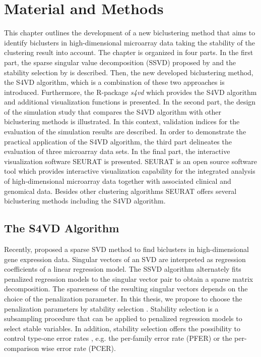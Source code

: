 \chapter{Material and Methods}
This chapter outlines the development of a new biclustering method that aims to identify biclusters in high-dimensional microarray data taking the stability of the  clustering result into account. The chapter is organized in four parts. In the first part, the sparse singular value decomposition (SSVD) proposed by \citet{Lee2010} and the stability selection by \citet{Meinshausen2010} is described. Then, the new developed biclustering method, the S4VD algorithm, which is a combination of these two approaches is introduced. Furthermore, the R-package \textit{s4vd} which provides the S4VD algorithm and additional visualization functions is presented. In the second part, the design of the simulation study that compares the S4VD algorithm with other biclustering methods is illustrated. In this context, validation indices for the evaluation of the simulation results are described. In order to demonstrate the practical application of the S4VD algorithm, the third part delineates the evaluation of three microarray data sets. In the final part, the interactive visualization software SEURAT \cite{Gribov2010} is presented. SEURAT is an open source software tool which provides interactive visualization capability for the integrated analysis of high-dimensional microarray data together with associated clinical and genomical data. Besides other clustering algorithms SEURAT offers several biclustering methods including the S4VD algorithm.

\section{The S4VD Algorithm}
Recently, \citet{Lee2010} proposed a sparse SVD method to find biclusters in high-dimensional gene expression data. Singular vectors of an SVD are interpreted as regression coefficients of a linear regression model. The SSVD algorithm alternately fits penalized regression models to the singular vector pair to obtain a sparse matrix decomposition. The sparseness of the resulting singular vectors depends on the choice of the penalization parameter. In this thesis, we propose to choose the penalization parameters by stability selection \cite{Meinshausen2010}. Stability selection is a subsampling procedure that can be applied to penalized regression models to select stable variables. In addition, stability selection offers the possibility to control type-one error rates \cite{Dudoit2003}, e.g. the per-family error rate (PFER) or the per-comparison wise error rate (PCER). 


